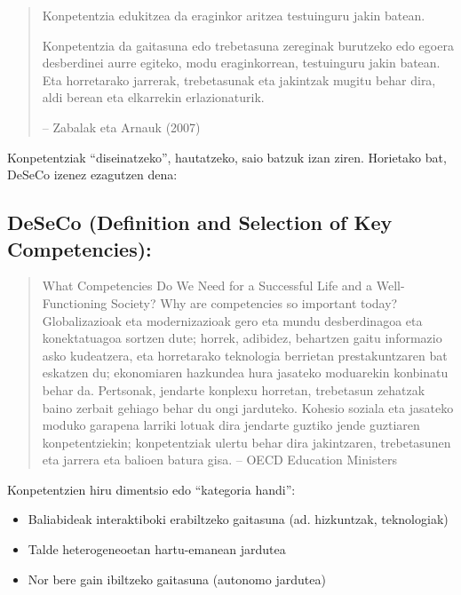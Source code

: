 \documentclass[
]{book}
\providecommand{\tightlist}{%
  \setlength{\itemsep}{0pt}\setlength{\parskip}{0pt}}
\begin{document}
\begin{quote}
Konpetentzia edukitzea da eraginkor aritzea testuinguru jakin batean.

Konpetentzia da gaitasuna edo trebetasuna zereginak burutzeko edo egoera desberdinei aurre egiteko, modu eraginkorrean, testuinguru jakin batean. Eta horretarako jarrerak, trebetasunak eta jakintzak mugitu behar dira, aldi berean eta elkarrekin erlazionaturik.

-- Zabalak eta Arnauk (2007)
\end{quote}

Konpetentziak ``diseinatzeko'', hautatzeko, saio batzuk izan ziren. Horietako bat, DeSeCo izenez ezagutzen dena:

\hypertarget{deseco-definition-and-selection-of-key-competencies}{%
\subsection{DeSeCo (Definition and Selection of Key Competencies):}\label{deseco-definition-and-selection-of-key-competencies}}

\begin{quote}
What Competencies Do We Need for a Successful Life and a Well-Functioning Society?
Why are competencies so important today? Globalizazioak eta modernizazioak gero eta mundu desberdinagoa eta konektatuagoa sortzen dute; horrek, adibidez, behartzen gaitu informazio asko kudeatzera, eta horretarako teknologia berrietan prestakuntzaren bat eskatzen du; ekonomiaren hazkundea hura jasateko moduarekin konbinatu behar da. Pertsonak, jendarte konplexu horretan, trebetasun zehatzak baino zerbait gehiago behar du ongi jarduteko. Kohesio soziala eta jasateko moduko garapena larriki lotuak dira jendarte guztiko jende guztiaren konpetentziekin; konpetentziak ulertu behar dira jakintzaren, trebetasunen eta jarrera eta balioen batura gisa.
-- OECD Education Ministers
\end{quote}

Konpetentzien hiru dimentsio edo ``kategoria handi'':

\begin{itemize}
\tightlist
\item
  Baliabideak interaktiboki erabiltzeko gaitasuna (ad. hizkuntzak, teknologiak)
\item
  Talde heterogeneoetan hartu-emanean jardutea
\item
  Nor bere gain ibiltzeko gaitasuna (autonomo jardutea)
\end{itemize}
\end{document}

